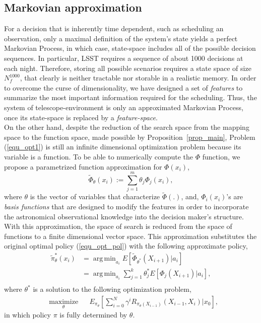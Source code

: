 \documentclass[11pt]{article}
\theoremstyle{definition}
\DeclareMathOperator*{\argmin}{arg\,min}
\begin{document}
\subsection{Markovian approximation}\label{sec_Markov_approx}
For a decision that is inherently time dependent, such as scheduling an observation, only a maximal definition of the system's state yields a perfect Markovian Process, in which case, state-space includes all of the possible decision sequences. In particular, LSST requires a sequence of about 1000 decisions at each night. Therefore, storing all possible scenarios requires a state space of size $N_{f}^{1000}$, that clearly is neither tractable nor storable in a realistic memory. In order to overcome the curse of dimensionality, we have designed a set of   \textit{features} to summarize the most important information required for the scheduling. Thus, the system of telescope-environment is only an approximated Markovian Process, once its state-space is replaced by a \textit{feature-space}. \\
On the other hand, despite the reduction of the search space from the mapping space to the function space, made possible by Proposition~\ref{prop_main}, Problem (\ref{equ_opt1}) is still an infinite dimensional optimization problem because its variable is a function. To be able to numerically compute the $\Phi$ function, we propose a parametrized function approximation for $\Phi(x_{i})$,
\begin{equation*}
 \tilde{\Phi}_{\theta}({x}_{i}) := \sum_{j=1}^m \theta_j \Phi_j(x_{i}),
\end{equation*}
where $\theta$ is the vector of variables that characterize $\tilde{\Phi}(.)$, and, $\Phi_i(x_i)$'s are \textit{basis functions} that are designed to modify the features in order to incorporate the astronomical observational knowledge into the decision maker's structure. With this approximation, the space of search is reduced from the space of functions to a finite dimensional vector space. This approximation substitutes the original optimal policy (\ref{equ_opt_pol}) with the following approximate policy,
\begin{equation}\label{equ_approx_pol}
\begin{aligned}
\tilde{\pi}_{\theta}^*(x_{i})& = \argmin_{a_{i}} E[ \tilde{\Phi}_{\theta^*}(X_{i+1}) | a_{i}]\\
& =  \argmin_{a_{i}} \sum_{j=1}^k \theta^*_j E[\Phi_j(X_{i+1}) | a_{i}],\\
\end{aligned}
\end{equation}
where $\theta^*$ is a solution to the following optimization problem,
\begin{equation}\label{equ_opt3}
\begin{aligned}
& \underset{\theta}{\text{maximize}}
& & E_{\pi_{\theta}}[\sum_{i=0}^N \gamma^i R_{\pi_{\theta} (X_{i-1})}(X_{{i-1}}, X_{i}) | x_0],
\end{aligned}
\end{equation}
in which policy $\pi$ is fully determined by $\theta$.
\end{document}
